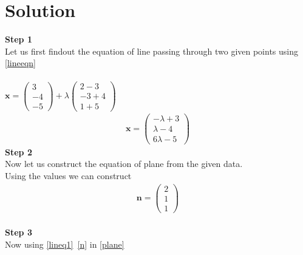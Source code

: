 \documentclass[10pt,a4paper,twocolumn]{article}
\numberwithin{equation}{section}
\begin{document}
\section{Solution}
\textbf{Step 1}\\
Let us first findout the equation of line passing through two given points using \ref{lineeqn} \\
\\$\textbf{x}=\begin{pmatrix}3 \\-4 \\-5\end{pmatrix}+\lambda \begin{pmatrix}2-3 \\-3+4 \\1+5\end{pmatrix}$
\\
\begin{gather}\label{lineq1}
\textbf{x}=\begin{pmatrix} -\lambda +3\\ \lambda - 4\\6 \lambda - 5\end{pmatrix}
\end{gather}
\textbf{Step 2}\\
Now let us construct the equation of plane from the given data.\\
Using the values we can construct 
\begin{gather}\label{n}
\textbf{n}=\begin{pmatrix} 2\\ 1\\1\end{pmatrix}
\end{gather}\\

\textbf{Step 3}\\
Now using \ref{lineq1}\  \ref{n}   in \ref{plane}\\
\end{document}

